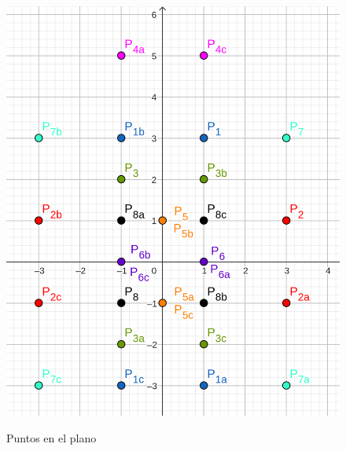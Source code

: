 \documentclass{article}
\begin{document}
\begin{figure}[ht]
\caption{Puntos en el plano}
\includegraphics[scale=1]{../../common/sb_28/ex_00/ex_13.png} 
\centering
\label{fig:13}
\end{figure}
\end{document}
